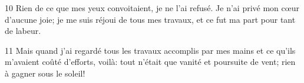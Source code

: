 
10 Rien de ce que mes yeux convoitaient, je ne l’ai refusé. Je n’ai privé mon cœur d’aucune joie; je me suis réjoui de tous mes travaux, et ce fut ma part pour tant de labeur.

11 Mais quand j’ai regardé tous les travaux accomplis par mes mains et ce qu’ils m’avaient coûté d’efforts, voilà: tout n’était que vanité et poursuite de vent; rien à gagner sous le soleil!